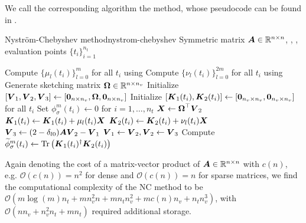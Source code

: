 We call the corresponding algorithm the  method, whose pseudocode
can be found in .
\begin{algo}{Nystr\"om-Chebyshev method}{nystrom-chebyshev}
    Symmetric matrix $\boldsymbol{A} \in \mathbb{R}^{n \times n}$, , ,
    evaluation points $\{t_i\}_{i=1}^{n_t}$
    \begin{algorithmic}[1]
        \State Compute $\{\mu_l(t_i)\}_{l=0}^m$ for all $t_i$ using 
        \State Compute $\{\nu_l(t_i)\}_{l=0}^{2m}$ for all $t_i$ using 
        \State Generate sketching matrix $\boldsymbol{\Omega} \in \mathbb{R}^{n \times n_v}$ %
        \State Initialize $[\boldsymbol{V}_1, \boldsymbol{V}_2, \boldsymbol{V}_3] \gets [\boldsymbol{0}_{n \times n_v}, \boldsymbol{\Omega}, \boldsymbol{0}_{n \times n_v}]$
        \State Initialize $[\boldsymbol{K}_1(t_i), \boldsymbol{K}_2(t_i)] \gets [\boldsymbol{0}_{n_v \times n_v}, \boldsymbol{0}_{n_v \times n_v}]$ for all $t_i$
        \State Set ${\phi}_{\sigma}^m(t_i) \gets 0$ for $i=1,\dots,n_t$
          \State $\boldsymbol{X} \gets \boldsymbol{\Omega}^{\top} \boldsymbol{V}_2$
                \State $\boldsymbol{K}_1(t_i) \gets \boldsymbol{K}_1(t_i) + \mu_l(t_i) \boldsymbol{X}$
            \EndIf
            \State $\boldsymbol{K}_2(t_i) \gets \boldsymbol{K}_2(t_i) + \nu_l(t_i) \boldsymbol{X}$
          \EndFor
          \State $\boldsymbol{V}_3 \gets (2 - \delta_{l0}) \boldsymbol{A} \boldsymbol{V}_2 - \boldsymbol{V}_1$ 
          \State $\boldsymbol{V}_1 \gets \boldsymbol{V}_2, \boldsymbol{V}_2 \gets \boldsymbol{V}_3$
        \EndFor
          \State Compute $\widetilde{\phi}_{\sigma}^m(t_i) \gets \operatorname{Tr}\left( \boldsymbol{K}_1(t_i)^{\dagger}\boldsymbol{K}_2(t_i) \right)$
        \EndFor
    \end{algorithmic}
\end{algo}

Again denoting the cost of a matrix-vector product of $\boldsymbol{A} \in \mathbb{R}^{n \times n}$
with $c(n)$, e.g. $\mathcal{O}(c(n)) = n^2$ for dense and $\mathcal{O}(c(n)) = n$
for sparse matrices, we find the computational complexity of the \gls{NC}
method to be $\mathcal{O}(m \log(m) n_t + m n_v^2 n + m n_t n_v^2 +  m c(n) n_v + n_t n_v^3)$, with
$\mathcal{O}(n n_v + n_v^2 n_t + m n_t)$ required additional storage.


